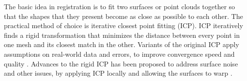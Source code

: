 The basic idea in registration is to fit two surfaces or point clouds together so that the shapes that they present become as close as possible to each other.
The practical method of choice is iterative closest point fitting (ICP).
ICP iteratively finds a rigid transformation that minimizes the distance between every point in one mesh and its closest match in the other.
Variants of the original ICP apply assumptions on real-world data and errors, to improve convergence speed and quality \cite{zhang1994iterative,rusinkiewicz2001efficient}.
Advances to the rigid ICP has been proposed to address surface noise and other issues, by applying ICP locally and allowing the surfaces to warp \cite{brown2007global}.


